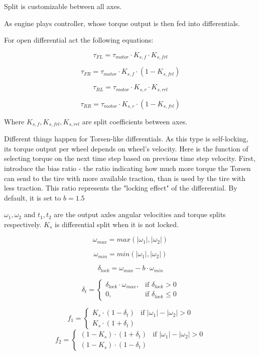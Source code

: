 \documentclass[a4paper,11pt]{article}
\begin{document}
Split is customizable between all axes.

As engine plays controller, whose torque output is then fed into differentials. 

For open differential act the following equations:

$$
\tau_{FL} = \tau_{motor} \cdot K_{s,f} \cdot K_{s,frl}
$$

$$
\tau_{FR} = \tau_{motor} \cdot K_{s,f} \cdot (1 - K_{s,frl})
$$

$$
\tau_{RL} = \tau_{motor} \cdot K_{s,r} \cdot K_{s,rrl}
$$

$$
\tau_{RR} = \tau_{motor} \cdot K_{s,r} \cdot (1 - K_{s,frl})
$$


Where $K_{s,f}, K_{s,frl}, K_{s,rrl}$ are split coefficients between axes.

Different things happen for Torsen-like differentials. 
As this type is self-locking, its torque output per wheel depends on wheel's velocity. Here is the function of selecting torque on the next time step based on previous time step velocity. First, introduce the bias ratio - the ratio indicating how much more torque the Torsen can send to the tire with more available traction, than is used by the tire with less traction. This ratio represents the "locking effect" of the differential. By default, it is set to $b = 1.5$

$\omega_1, \omega_2$ and $t_1, t_2$ are the output axles angular velocities and torque splits respectively. $K_s$ is differential split when it is not locked.

$$
\omega_{max} = max(|\omega_1|, |\omega_2|)
$$

$$
\omega_{min} = min(|\omega_1|, |\omega_2|)
$$

$$
\delta_{lock} = \omega_{max} - b \cdot \omega_{min}
$$

$$
\delta_t = 
\begin{cases}
	\delta_{lock} \cdot \omega_{max}, & \mbox{if } \delta_{lock} > 0 \\
	0, & \mbox{if } \delta_{lock} \leq 0
\end{cases}
$$

$$
f_1 = 
\begin{cases}
	K_s \cdot (1 - \delta_t) & \mbox{if } |\omega_1| - |\omega_2| > 0 \\
	K_s \cdot (1 + \delta_t)
\end{cases}
$$
$$
f_2 = 
\begin{cases}
	(1 - K_s) \cdot (1 + \delta_t) & \mbox{if } |\omega_1| - |\omega_2| > 0 \\
	(1 - K_s) \cdot (1 - \delta_t)
\end{cases}
$$
\end{document}
